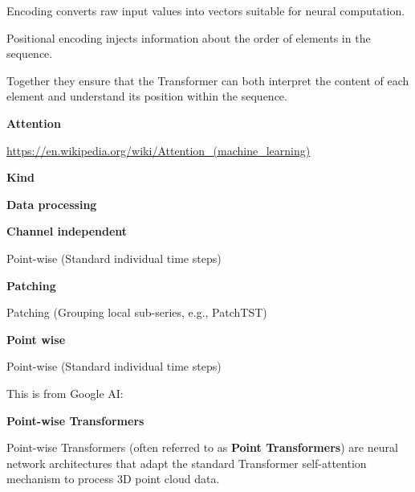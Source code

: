 \documentclass{book}
\providecommand{\ProjectDeepHeading}[2]{%
    \par\medskip\noindent\textbf{#2}\par\smallskip
}
\begin{document}
    Encoding converts raw input values into vectors suitable for neural computation.
    
    Positional encoding injects information about the order of elements in the sequence.
    
    Together they ensure that the Transformer can both interpret the content of each element and understand its position within the sequence.
    

\ProjectDeepHeading{4}{Attention}


\url{https://en.wikipedia.org/wiki/Attention_(machine_learning)}

\ProjectDeepHeading{4}{Kind}

\ProjectDeepHeading{5}{Data processing}

\ProjectDeepHeading{6}{Channel independent}


Point-wise (Standard individual time steps)

\ProjectDeepHeading{6}{Patching}


Patching (Grouping local sub-series, e.g., PatchTST)

\ProjectDeepHeading{6}{Point wise}


Point-wise (Standard individual time steps)


This is from Google AI:
\ProjectDeepHeading{9}{Point-wise Transformers}
    
    Point-wise Transformers (often referred to as \textbf{Point Transformers}) are neural network architectures that adapt the standard Transformer self-attention mechanism to process 3D point cloud data.
    
\end{document}
